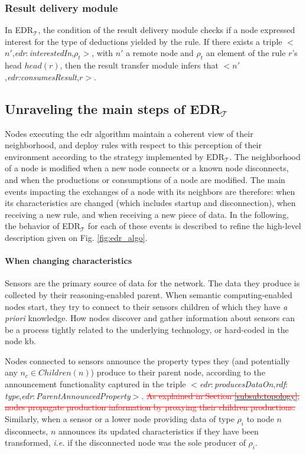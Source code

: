 \documentclass{iosart2c}
\newcommand{\edrt}{EDR$_{\mathcal{T}}$\xspace}
\newcommand{\removed}[1]{\textcolor{red}{\sout{#1}}}
\newcommand{\namespace}[1]{\textit{#1$:$}}
\newcommand{\concept}[2]{\namespace{#1}\-\textit{#2}}
\newcommand{\triplet}[3]{$<$#1,\textit{#2},#3$>$}
\begin{document}
\subsubsection{Result delivery module}

In \edrt, the condition of the result delivery module checks if a node expressed interest for the type of deductions yielded by the rule. 
If there exists a triple \triplet{$n'$}{\concept{edr}{interest\-ed\-In}}{$\rho_t$}, with $n'$ a remote node and $\rho_t$ an element of the rule $r$'s head $head(r)$, then the result transfer module infers that \triplet{$n'$}{edr:consumes\-Result}{$r$}. 

\subsection{Unraveling the main steps of \edrt}
\label{subs:edrpt_algo}

Nodes executing the \gls{edr} algorithm maintain a coherent view of their neighborhood, and deploy rules with respect to this perception of their environment according to the strategy implemented by \edrt.
The neighborhood of a node is modified when a new node connects or a known node disconnects, and when the productions or consumptions of a node are modified.
The main events impacting the exchanges of a node with its neighbors are therefore: when its characteristics are changed (which includes startup and disconnection), when receiving a new rule, and when receiving a new piece of data.
In the following, the behavior of \edrt for each of these events is described to refine the high-level description given on Fig. \ref{fig:edr_algo}.

\paragraph{When changing characteristics}
\label{subsub:init}
Sensors are the primary source of data for the network. The data they produce is collected by their reasoning-enabled parent. 
When semantic computing-enabled nodes start, they try to connect to their sensors children of which they have \textit{a priori} knowledge.
How nodes discover and gather information about sensors can be a process tightly related to the underlying technology, or hard-coded in the node \gls{kb}.

Nodes connected to sensors announce the property types they (and potentially any $n_c\in Children(n)$) produce to their parent node, according to the announcement functionality captured in the triple \triplet{\concept{edr}{produces\-Data\-On}}{\concept{rdf}{type}}{\concept{edr}{Parent\-Announced\-Property}}. 
\removed{As explained in Section \textsection \ref{subsub:topology}, nodes propagate production information by proxying their children productions.}
Similarly, when a sensor or a lower node providing data of type $\rho_{i}$ to node $n$ disconnects, $n$ announces its updated characteristics if they have been transformed, \textit{i.e.} if the disconnected node was the sole producer of $\rho_{i}$.
\end{document}
